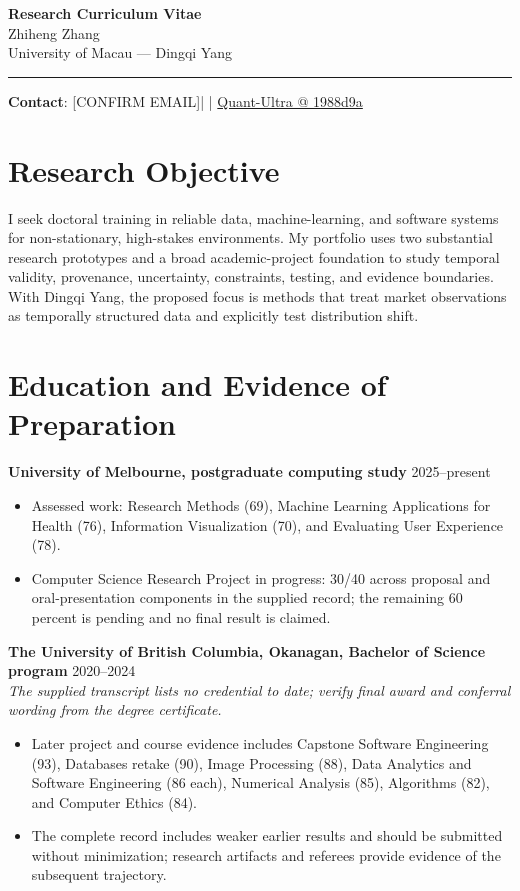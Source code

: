 \documentclass[11pt]{article}
\makeatletter
\newcommand{\ApplicantName}{Zhiheng Zhang}
\newcommand{\ApplicantEmail}{[CONFIRM EMAIL]}
\newcommand{\ApplicantPhone}{[CONFIRM PHONE]}
\newcommand{\ApplicantGitHub}{\href{https://github.com/zhiheng-zhang-Mera/Quant-Ultra/tree/1988d9a8530da91a8158de864d098ea869098923}{Quant-Ultra @ 1988d9a}}
\makeatother
\begin{document}
\begin{center}
{\LARGE\bfseries Research Curriculum Vitae}\\[0.25em]
{\large \ApplicantName}\\
University of Macau --- Dingqi Yang
\end{center}
\vspace{0.35em}\hrule\vspace{0.65em}

\textbf{Contact}: \ApplicantEmail\quad | \quad \ApplicantPhone\quad | \quad \ApplicantGitHub

\section*{Research Objective}
I seek doctoral training in reliable data, machine-learning, and software systems for non-stationary, high-stakes environments. My portfolio uses two substantial research prototypes and a broad academic-project foundation to study temporal validity, provenance, uncertainty, constraints, testing, and evidence boundaries. With Dingqi Yang, the proposed focus is methods that treat market observations as temporally structured data and explicitly test distribution shift.

\section*{Education and Evidence of Preparation}
\textbf{University of Melbourne, postgraduate computing study} \hfill 2025--present
\begin{itemize}
\item Assessed work: Research Methods (69), Machine Learning Applications for Health (76), Information Visualization (70), and Evaluating User Experience (78).
\item Computer Science Research Project in progress: 30/40 across proposal and oral-presentation components in the supplied record; the remaining 60 percent is pending and no final result is claimed.
\end{itemize}

\textbf{The University of British Columbia, Okanagan, Bachelor of Science program} \hfill 2020--2024\\
\textit{The supplied transcript lists no credential to date; verify final award and conferral wording from the degree certificate.}
\begin{itemize}
\item Later project and course evidence includes Capstone Software Engineering (93), Databases retake (90), Image Processing (88), Data Analytics and Software Engineering (86 each), Numerical Analysis (85), Algorithms (82), and Computer Ethics (84).
\item The complete record includes weaker earlier results and should be submitted without minimization; research artifacts and referees provide evidence of the subsequent trajectory.
\end{itemize}
\end{document}
